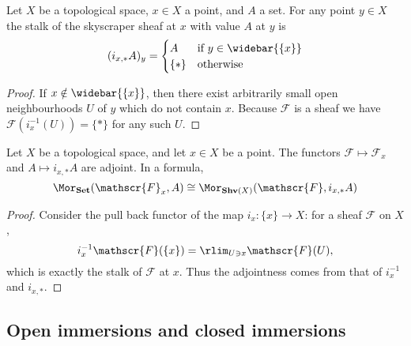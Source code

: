 \begin{lemma}\label{stalk of skyscraper}
Let $X$ be a topological space, $x\in X$ a point, and $A$ a set. For any point $y\in X$ the stalk of the skyscraper sheaf at $x$ with value $A$ at $y$ is
\[(i_{x,*}A)_y=\begin{cases}
A&\text{if }y\in\widebar{\{x\}}\\
\{\ast\}&\text{otherwise}
\end{cases}\]
\end{lemma}
\begin{proof}
If $x\notin\widebar{\{x\}}$, then there exist arbitrarily small open neighbourhoods $U$ of $y$ which do not contain $x$. Because $\mathscr{F}$ is a sheaf we have $\mathscr{F}(i_x^{-1}(U))=\{\ast\}$ for any such $U$.
\end{proof}
\begin{proposition}\label{stalk adj skyscraper}
Let $X$ be a topological space, and let $x\in X$ be a point. The functors $\mathscr{F}\mapsto\mathscr{F}_x$ and $A\mapsto i_{x,*}A$ are adjoint. In a formula,
\[\Mor_{\mathbf{Set}}(\mathscr{F}_x,A)\cong\Mor_{\mathbf{Shv}(X)}(\mathscr{F},i_{x,*}A)\]
\end{proposition}
\begin{proof}
Consider the pull back functor of the map $i_x:\{x\}\to X$: for a sheaf $\mathscr{F}$ on $X$,
\[i_x^{-1}\mathscr{F}(\{x\})=\rlim_{U\ni x}\mathscr{F}(U),\]
which is exactly the stalk of $\mathscr{F}$ at $x$. Thus the adjointness comes from that of $i_x^{-1}$ and $i_{x,*}$.
\end{proof}
\subsection{Open immersions and closed immersions}
